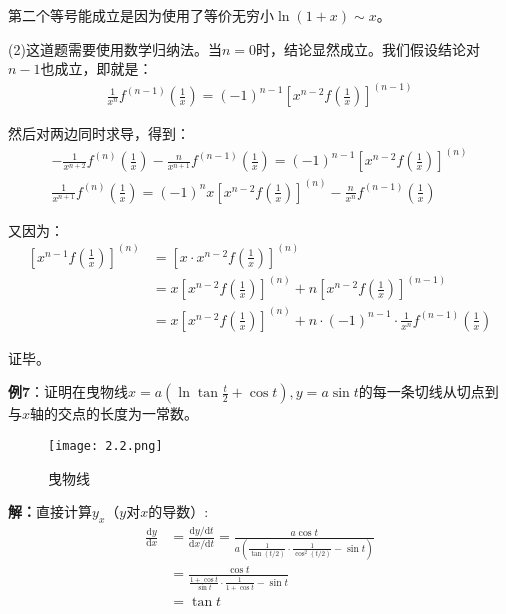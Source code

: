 \documentclass{ctexart}
\let\oldtextbf\textbf %
\renewcommand{\textbf}[1]{\textcolor{btex}{\oldtextbf{#1}}} %
\begin{document}
第二个等号能成立是因为使用了等价无穷小$\ln(1+x)\sim x$。

(2)这道题需要使用数学归纳法。当$n=0$时，结论显然成立。我们假设结论对$n-1$也成立，即就是：
\begin{align*}
    \frac{1}{x^{n}}f^{(n-1)}(\frac{1}{x})=(-1)^{n-1}[x^{n-2}f(\frac{1}{x})]^{(n-1)}
\end{align*}

然后对两边同时求导，得到：
\begin{gather*}
       -\frac{1}{x^{n+2}}f^{(n)}(\frac{1}{x})-\frac{n}{x^{n+1}}f^{(n-1)}(\frac{1}{x})=(-1)^{n-1}
[x^{n-2}f(\frac{1}{x})]^{(n)}    \\
 \frac{1}{x^{n+1}}f^{(n)}(\frac{1}{x})=(-1)^{n}x[x^{n-2}f(\frac{1}{x})]^{(n)}-\frac{n}{x^{n}}f^{(n-1)}(\frac{1}{x}) 
\end{gather*}

又因为：
\begin{align*}
 \left[ x^{n-1}f(\frac{1}{x})\right]^{(n)}&=  \left[ x\cdot x^{n-2}f(\frac{1}{x})\right]^{(n)}\\
&=x \left[ x^{n-2}f(\frac{1}{x})\right]^{(n)}+ n\left[ x^{n-2}f(\frac{1}{x})\right]^{(n-1)}\\
&=x \left[ x^{n-2}f(\frac{1}{x})\right]^{(n)}+n\cdot (-1)^{n-1}\cdot\frac{1}{x^{n}}f^{(n-1)}(\frac{1}{x})
\end{align*}

证毕。

\textbf{例7}：证明在曳物线$x=a(\ln\tan\frac{t}{2}+\cos t),y=a\sin t$的每一条切线从切点到与$x$轴的交点的长度为一常数。
\begin{figure}[H]    
\centering     
\renewcommand{\figurename}{图}     
\renewcommand{\thefigure}{2.2}    
\begin{myimagebox}[width=0.35\textwidth] %
\texttt{[image: 2.2.png]} %
\end{myimagebox}     
\caption{\label{fig:2.2}曳物线}   
\end{figure}

\textbf{解：}直接计算$y_x$（$y$对$x$的导数）:
\begin{align*}
 \frac{\mathrm{d}y }{\mathrm{d}x }&=\frac{\mathrm{d}y/\mathrm{d}t  }{\mathrm{d}x/\mathrm{d}t }
=\frac{a\cos t}{a\left(\frac{1}{\tan (t/2)}\cdot\frac{1}{\cos^2(t/2)}-\sin t  \right)} \\
&=\frac{\cos t}{\frac{1+\cos t}{\sin t}\cdot\frac{1}{1+\cos t}-\sin t }\\
&=\tan t  
\end{align*}
\end{document}
